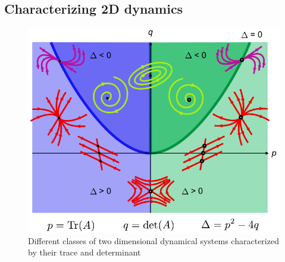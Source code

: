 \documentclass[a4paper,11pt]{exam}
\newcounter{ct}
\begin{document}
\begin{questions}
\subsection{Characterizing 2D dynamics}
\begin{figure}[t]
    \centering
    \includegraphics{figs/phase_plane_nodes.pdf}
    \caption{Different classes of two dimensional dynamical systems characterized by their trace and determinant}
\end{figure}

\end{questions}
\end{document}
